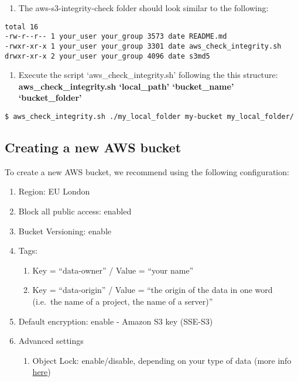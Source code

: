 \documentclass[]{book}
\providecommand{\tightlist}{%
  \setlength{\itemsep}{0pt}\setlength{\parskip}{0pt}}
\begin{document}
\begin{enumerate}
\def\labelenumi{\arabic{enumi}.}
\setcounter{enumi}{4}
\tightlist
\item
  The aws-s3-integrity-check folder should look similar to the
  following:
\end{enumerate}

\begin{verbatim}
total 16
-rw-r--r-- 1 your_user your_group 3573 date README.md
-rwxr-xr-x 1 your_user your_group 3301 date aws_check_integrity.sh
drwxr-xr-x 2 your_user your_group 4096 date s3md5
\end{verbatim}

\begin{enumerate}
\def\labelenumi{\arabic{enumi}.}
\setcounter{enumi}{5}
\tightlist
\item
  Execute the script `aws\_check\_integrity.sh' following the this
  structure: \textbf{aws\_check\_integrity.sh `local\_path'
  `bucket\_name' `bucket\_folder'}
\end{enumerate}

\begin{verbatim}
$ aws_check_integrity.sh ./my_local_folder my-bucket my_local_folder/
\end{verbatim}

\subsection{Creating a new AWS bucket}\label{creating-a-new-aws-bucket}

To create a new AWS bucket, we recommend using the following
configuration:

\begin{enumerate}
\def\labelenumi{\arabic{enumi}.}
\tightlist
\item
  Region: EU London
\item
  Block all public access: enabled
\item
  Bucket Versioning: enable
\item
  Tags:

  \begin{enumerate}
  \def\labelenumii{\arabic{enumii}.}
  \tightlist
  \item
    Key = ``data-owner'' / Value = ``your name''
  \item
    Key = ``data-origin'' / Value = ``the origin of the data in one word
    (i.e.~the name of a project, the name of a server)''
  \end{enumerate}
\item
  Default encryption: enable - Amazon S3 key (SSE-S3)
\item
  Advanced settings

  \begin{enumerate}
  \def\labelenumii{\arabic{enumii}.}
  \tightlist
  \item
    Object Lock: enable/disable, depending on your type of data (more
    info
    \href{https://docs.aws.amazon.com/AmazonS3/latest/dev/object-lock.html}{here})
  \end{enumerate}
\end{enumerate}
\end{document}
